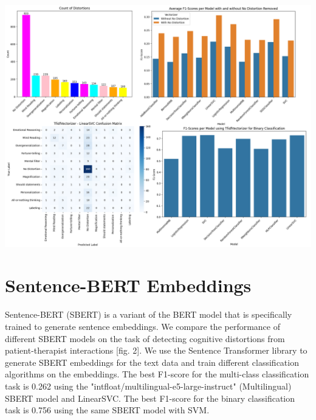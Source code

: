 \documentclass[a0,landscape]{a0poster}
\begin{document}
\begin{multicols}{4}
\begin{center}\vspace{0.5cm}
	\includegraphics[width=0.99\linewidth]{figures/1stFour.png}
	\label{figure1}
\end{center}\vspace{0.5cm}

\color{Teal}
\section*{Sentence-BERT Embeddings}
\color{Black}

Sentence-BERT (SBERT) is a variant of the BERT model that is specifically trained to generate sentence embeddings. We compare the performance of different SBERT models on the task of detecting cognitive distortions from patient-therapist interactions [fig. 2]. We use the Sentence Transformer library to generate SBERT embeddings for the text data and train different classification algorithms on the embeddings. The best F1-score for the multi-class classification task is 0.262 using the "intfloat/multilingual-e5-large-instruct" (Multilingual) SBERT model and LinearSVC. The best F1-score for the binary classification task is 0.756 using the same SBERT model with SVM.


\end{multicols}
\end{document}
